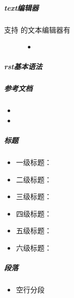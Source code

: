 \documentclass[a4paper,10pt,english]{sphinxmanual}
\begin{document}
\subparagraph{text编辑器}
\label{\detokenize{sphinx/1-generate/4-edit:text}}\begin{description}
\item[{支持  的文本编辑器有}] \leavevmode\begin{itemize}
\item {} 

\end{itemize}

\end{description}


\subparagraph{rst基本语法}
\label{\detokenize{sphinx/1-generate/4-edit:rst}}

\subparagraph{参考文档}
\label{\detokenize{sphinx/1-generate/4-edit:id2}}\begin{itemize}
\item {} 

\item {} 

\end{itemize}


\subparagraph{标题}
\label{\detokenize{sphinx/1-generate/4-edit:id5}}\begin{itemize}
\item {} 
一级标题：\sphinxcode{========}

\item {} 
二级标题：\sphinxcode{-{-}-{-}-{-}-{-}}

\item {} 
三级标题：\sphinxcode{\textasciitilde{}\textasciitilde{}\textasciitilde{}\textasciitilde{}\textasciitilde{}\textasciitilde{}\textasciitilde{}\textasciitilde{}}

\item {} 
四级标题：\sphinxcode{\textasciicircum{}\textasciicircum{}\textasciicircum{}\textasciicircum{}\textasciicircum{}\textasciicircum{}\textasciicircum{}\textasciicircum{}}

\item {} 
五级标题：\sphinxcode{++++++++}

\item {} 
六级标题：

\end{itemize}


\subparagraph{段落}
\label{\detokenize{sphinx/1-generate/4-edit:id6}}\begin{itemize}
\item {} 
空行分段

\end{itemize}
\end{document}
